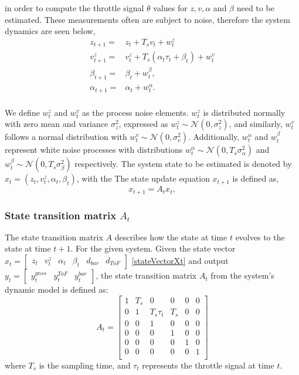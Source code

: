 \documentclass{report}
\begin{document}
    in order to compute the throttle signal \(\theta\) values for \(z, v, \alpha\) and \(\beta\) need to be estimated. These measurements often are subject to noise, therefore the system dynamics are seen below,
    \begin{align}
        z_{t+1} =& z_t + {T_s}{v_t} + w^{z}_{t}\\
        v_{t+1}^z =& v_t^z + T_s (\alpha_t \tau_t + \beta_t) + w_t^v\\
        \beta_{t+1} {}={} & \beta_t + w^\beta_t,\\
        \alpha_{t+1} {}={} & \alpha_t + w^\alpha_t.\\
    \end{align}

    We define $w_t^z$ and $w_t^v$ as the process noise elements. $w_t^z$ is
    distributed normally with zero mean and variance $\sigma_z^2$, expressed as
    $w_t^z \sim \mathcal{N}(0, \sigma_z^2)$, and similarly, $w_t^v$ follows a
    normal distribution with $w_t^v \sim \mathcal{N}(0, \sigma_v^2)$.
    Additionally, $w_t^\alpha$ and $w_t^\beta$ represent white noise processes
    with distributions $w_t^\alpha \sim \mathcal{N}(0, T_s \sigma_\alpha^2)$ and
    $w_t^\beta \sim \mathcal{N}(0, T_s \sigma_\beta^2)$ respectively. The
    system state to be estimated is denoted by $x_t = (z_t, v_t^z,
    \alpha_t, \beta_t)$, with the The state update equation \( x_{t+1} \) is defined as,
    \begin{equation}
        x_{t+1} = A_t x_t,
    \end{equation}

    \subsubsection*{State transition matrix \( A_t \)}
    The state transition matrix \( A \) describes how the state at time \( t \)
    evolves to the state at time \( t+1 \). For the given system. Given the
    state vector \( x_t = \begin{bmatrix} z_t&  v_t^z&  \alpha_t&  \beta_t&
    d_{bar}& d_{ToF} \end{bmatrix} \) \eqref{stateVectorXt} and output \(y_t =
    \begin{bmatrix} y^{gnss}_t & y^{ToF}_t& y^{bar}_t \end{bmatrix} \), the
    state transition matrix \( A_t \) from the system's dynamic model is defined
    as:
    \begin{equation}
    A_t = 
    \begin{bmatrix}
    1 & T_s & 0 & 0 & 0 & 0\\
    0 & 1 & T_s \tau_t & T_s & 0 & 0\\
    0 & 0 & 1 & 0 & 0 & 0 \\
    0 & 0 & 0 & 1 & 0 & 0 \\
    0 & 0 & 0 & 0 & 1 & 0 \\
    0 & 0 & 0 & 0 & 0 & 1 \\
    \end{bmatrix}
    \end{equation}
    where \( T_s \) is the sampling time, and \( \tau_t \) represents the
    throttle signal at time \( t \).
  
\end{document}
